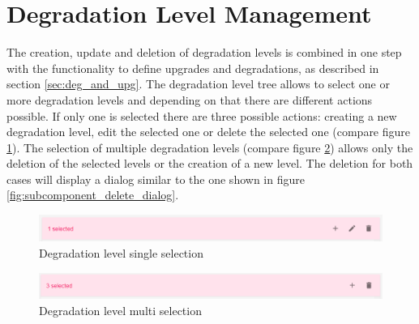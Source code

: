 \section{Degradation Level Management}
The creation, update and deletion of degradation levels is combined in one step with the functionality to define upgrades and degradations, as described in section \ref{sec:deg_and_upg}. The degradation level tree allows to select one or more degradation levels and depending on that there are different actions possible. If only one is selected there are three possible actions: creating a new degradation level, edit the selected one or delete the selected one (compare figure \ref{fig:degradation_crud_level_single}). The selection of multiple degradation levels (compare figure \ref{fig:degradation_crud_level_multi}) allows only the deletion of the selected levels or the creation of a new level. The deletion for both cases will display a dialog similar to the one shown in figure \ref{fig:subcomponent_delete_dialog}.

\begin{figure}[ht]
    \centering
    \includegraphics[width=\textwidth]{img/degradation_level_crud_single.PNG}
    \caption{Degradation level single selection}
    \label{fig:degradation_crud_level_single}
\end{figure}

\begin{figure}[ht]
    \centering
    \includegraphics[width=\textwidth]{img/degradation_level_crud_multi.PNG}
    \caption{Degradation level multi selection}
    \label{fig:degradation_crud_level_multi}
\end{figure}

